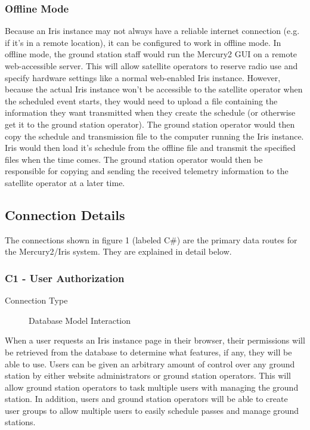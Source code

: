 \documentclass{mxl-note}
\begin{document}
\subsubsection{Offline Mode}
Because an Iris instance may not always have a reliable internet connection (e.g. if it's in a remote location), it can be configured to work in offline mode. In offline mode, the ground station staff would run the Mercury2 GUI on a remote web-accessible server. This will allow satellite operators to reserve radio use and specify hardware settings like a normal web-enabled Iris instance. However, because the actual Iris instance won't be accessible to the satellite operator when the scheduled event starts, they would need to upload a file containing the information they want transmitted when they create the schedule (or otherwise get it to the ground station operator). The ground station operator would then copy the schedule and transmission file to the computer running the Iris instance. Iris would then load it's schedule from the offline file and transmit the specified files when the time comes. The ground station operator would then be responsible for copying and sending the received telemetry information to the satellite operator at a later time. 

\subsection{Connection Details}
The connections shown in figure 1 (labeled C\#) are the primary data routes for the Mercury2/Iris system. They are explained in detail below.

\subsubsection{C1 - User Authorization}
\begin{description}
	\item [Connection Type] Database Model Interaction
\end{description}
When a user requests an Iris instance page in their browser, their permissions will be retrieved from the database to determine what features, if any, they will be able to use. Users can be given an arbitrary amount of control over any ground station by either website administrators or ground station operators. This will allow ground station operators to task multiple users with managing the ground station. In addition, users and ground station operators will be able to create user groups to allow multiple users to easily schedule passes and manage ground stations.
\end{document}
